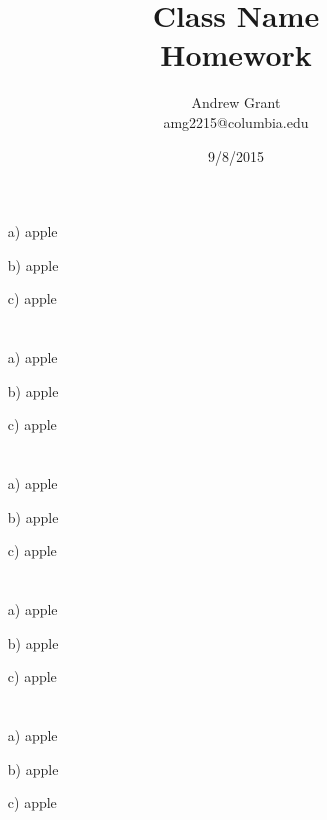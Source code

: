 \documentclass{article}
\title{Class Name\\Homework}
\author{Andrew Grant\\amg2215@columbia.edu}
\date{9/8/2015}
\begin{document}
\maketitle

\section{}

\begin{enumerate}
\item[a)] apple
\item[b)] apple
\item[c)] apple
\end{enumerate}

\section{}
\begin{enumerate}
\item[a)] apple
\item[b)] apple
\item[c)] apple
\end{enumerate}


\section{}
\begin{enumerate}
\item[a)] apple
\item[b)] apple
\item[c)] apple
\end{enumerate}


\section{}
\begin{enumerate}
\item[a)] apple
\item[b)] apple
\item[c)] apple
\end{enumerate}


\section{}
\begin{enumerate}
\item[a)] apple
\item[b)] apple
\item[c)] apple
\end{enumerate}
\end{document}
